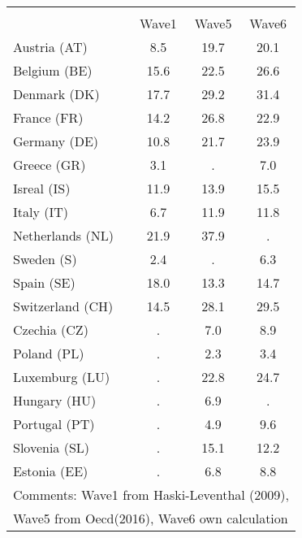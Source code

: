 {
\def\sym#1{\ifmmode^{#1}\else\(^{#1}\)\fi}
\begin{tabular}{l*{1}{ccc}}
\hline\hline
                    &\multicolumn{3}{c}{}                  \\
                    &       Wave1&       Wave5&       Wave6\\
\hline
Austria (AT)        &         8.5&        19.7&        20.1\\
Belgium (BE)        &        15.6&        22.5&        26.6\\
Denmark (DK)        &        17.7&        29.2&        31.4\\
France (FR)         &        14.2&        26.8&        22.9\\
Germany (DE)        &        10.8&        21.7&        23.9\\
Greece (GR)         &         3.1&           .&         7.0\\
Isreal (IS)         &        11.9&        13.9&        15.5\\
Italy (IT)          &         6.7&        11.9&        11.8\\
Netherlands (NL)    &        21.9&        37.9&           .\\
Sweden (S)          &         2.4&           .&         6.3\\
Spain (SE)          &        18.0&        13.3&        14.7\\
Switzerland (CH)    &        14.5&        28.1&        29.5\\
Czechia (CZ)        &           .&         7.0&         8.9\\
Poland (PL)         &           .&         2.3&         3.4\\
Luxemburg (LU)      &           .&        22.8&        24.7\\
Hungary (HU)        &           .&         6.9&           .\\
Portugal (PT)       &           .&         4.9&         9.6\\
Slovenia (SL)       &           .&        15.1&        12.2\\
Estonia (EE)        &           .&         6.8&         8.8\\
\hline\hline
\multicolumn{4}{l}{\footnotesize Comments: Wave1 from Haski-Leventhal (2009),}\\
\multicolumn{4}{l}{\footnotesize Wave5 from Oecd(2016), Wave6 own calculation}\\
\end{tabular}
}
